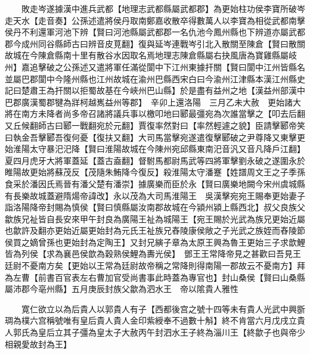 　　敗走岑遂據漢中進兵武都【地理志武都縣屬武都郡】為更始柱功侯李寶所破岑走天水【走音奏】公孫述遣將侯丹取南鄭嘉收散卒得數萬人以李寶為相從武都南擊侯丹不利還軍河池下辨【賢曰河池縣屬武都郡一名仇池今鳳州縣也下辨道亦屬武都郡今成州同谷縣師古曰辨音皮莧翻】復與延岑連戰岑引北入散關至陳倉【賢曰散關故城在今陳倉縣南十里有散谷水因取名焉地理志陳倉縣屬右抉風唐為寶雞縣屬岐州】嘉追擊破之公孫述又遣將軍任滿從閬中下江州東據扞關【賢曰閬中江州皆縣名並屬巴郡閬中今隆州縣也江州故城在渝州巴縣西宋白曰今渝州江津縣本漢江州縣史記曰楚肅王為扞關以拒蜀故基在今峽州巴山縣】於是盡有益州之地【漢益州部漢中巴郡廣漢蜀郡犍為牂柯越嶲益州等郡】　辛卯上還洛陽　三月乙未大赦　更始諸大將在南方未降者尚多帝召諸將議兵事以檄叩地曰郾最彊宛為次誰當擊之【叩去后翻又丘候翻師古曰郾一戰翻宛於元翻】賈復率然對曰【率然輕遽之貌】臣請擊郾帝笑曰執金吾擊郾吾復何憂【復扶又翻】大司馬當擊宛遂遣復擊郾破之尹尊降又東擊更始淮陽太守暴汜汜降【賢曰淮陽故城在今陳州宛邱縣東南汜音汎又音凡降戶江翻】　夏四月虎牙大將軍蓋延【蓋古盍翻】督駙馬都尉馬武等四將軍擊劉永破之遂圍永於睢陽故更始將蘇茂反【茂隨朱鮪降今復反】殺淮陽太守潘蹇【姓譜周文王之子季孫食采於潘因氏焉晉有潘父楚有潘崇】據廣樂而臣於永【賢曰廣樂地闕今宋州虞城縣有長樂故城蓋避隋煬帝諱改】永以茂為大司馬淮陽王　吳漢擊宛宛王賜奉更始妻子詣洛陽降帝封賜為慎侯【賢曰慎縣屬汝南郡故城在今潁州潁上縣西北】叔父良族父歙族兄祉皆自長安來甲午封良為廣陽王祉為城陽王【宛王賜於光武為族兄更始近屬也歙許及翻亦更始近屬更始封為元氏王祉族兄舂陵康侯敞之子光武之族姪而舂陵節侯買之嫡曾孫也更始封為定陶王】又封兄縯子章為太原王興為魯王更始三子求歆鯉皆為列侯【求為襄邑侯歆為穀熟侯鯉為夀光侯】　鄧王王常降帝見之甚歡曰吾見王廷尉不憂南方矣【更始以王常為廷尉故帝稱之常降則得南陽一郡故云不憂南方】拜為左曹【前書百官表左右曹加官受尚書事此時蓋為專官也】封山桑侯【賢曰山桑縣屬沛郡今亳州縣】五月庚辰封族父歙為泗水王　帝以隂貴人雅性

　　寛仁欲立以為后貴人以郭貴人有子【西都後宫之號十四等未有貴人光武中興斵琱為樸六宫稱號唯有皇后貴人貴人金印紫綬奉不過數十斛】終不肯當六月戊戌立貴人郭氏為皇后立其子彊為皇太子大赦丙午封泗水王子終為淄川王【終歙子也與帝少相親愛故封為王】

